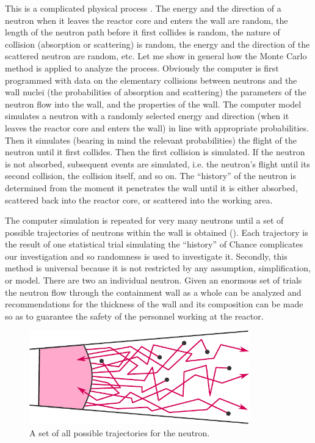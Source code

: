This is a complicated physical process .
The energy and the direction of a neutron when it leaves the reactor
core and enters the wall are random, the length of the neutron path
before it first collides is random, the nature of collision (absorption or
scattering) is random, the energy and the direction of the scattered
neutron are random, etc. Let me show in general how the Monte Carlo
method is applied to analyze the process. Obviously the computer is
first programmed with data on the elementary collisions between
neutrons and the wall nuclei (the probabilities of absorption and
scattering) the parameters of the neutron flow into the wall, and the
properties of the wall. The computer model simulates a neutron with
a randomly selected energy and direction (when it leaves the reactor
core and enters the wall) in line with appropriate probabilities. Then it
simulates (bearing in mind the relevant probabilities) the flight of the
neutron until it first collides. Then the first collision is simulated. If the
neutron is not absorbed, subsequent events are simulated, i.e. the
neutron's flight until its second collision, the collision itself, and so on.
The ``history'' of the neutron is determined from the moment it
penetrates the wall until it is either absorbed, scattered back into the
reactor core, or scattered into the working area. 

The computer simulation is repeated for very many neutrons until a set of possible
trajectories of neutrons within the wall is obtained (). Each trajectory is the result of one statistical trial simulating the ``history'' of
Chance complicates our investigation and so randomness is used to
investigate it. Secondly, this method is universal because it is not
restricted by any assumption, simplification, or model. There are two
an individual neutron. Given an enormous set of trials the neutron flow
through the containment wall as a whole can be analyzed and
recommendations for the thickness of the wall and its composition can
be made so as to guarantee the safety of the personnel working at the
reactor.
 \begin{figure}[!h]
 \centering
 \includegraphics[width=0.85\textwidth]{figures/neutron-path.pdf}
\caption{A set of all possible trajectories for the neutron.\label{neutron-path}}
 \end{figure}

